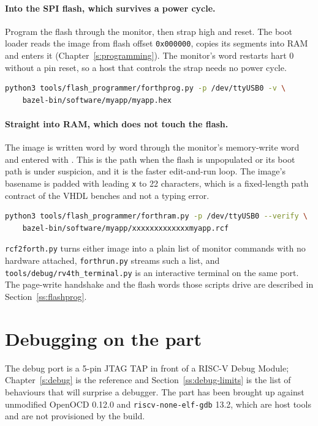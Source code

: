 \documentclass[11pt,pdftex,openany,letterpaper]{report}
\begin{document}
\paragraph{Into the SPI flash, which survives a power cycle.} Program the flash through the monitor, then strap  high and reset. The boot loader reads the image from flash offset \texttt{0x000000}, copies its segments into RAM and enters it (Chapter~\ref{s:programming}). The monitor's  word restarts hart 0 without a pin reset, so a host that controls the strap needs no power cycle.

\begin{lstlisting}[language=bash]
python3 tools/flash_programmer/forthprog.py -p /dev/ttyUSB0 -v \
    bazel-bin/software/myapp/myapp.hex
\end{lstlisting}

\paragraph{Straight into RAM, which does not touch the flash.} The image is written word by word through the monitor's memory-write word and entered with . This is the path when the flash is unpopulated or its boot path is under suspicion, and it is the faster edit-and-run loop. The image's basename is padded with leading \texttt{x} to 22 characters, which is a fixed-length path contract of the VHDL benches and not a typing error.

\begin{lstlisting}[language=bash]
python3 tools/flash_programmer/forthram.py -p /dev/ttyUSB0 --verify \
    bazel-bin/software/myapp/xxxxxxxxxxxxxmyapp.rcf
\end{lstlisting}

\noindent \texttt{rcf2forth.py} turns either image into a plain list of monitor commands with no hardware attached, \texttt{forthrun.py} streams such a list, and \texttt{tools/debug/rv4th\_terminal.py} is an interactive terminal on the same port. The page-write handshake and the flash words those scripts drive are described in Section~\ref{ss:flashprog}.

\section{Debugging on the part} \label{ss:swdebug}

The debug port is a 5-pin JTAG TAP in front of a RISC-V Debug Module; Chapter~\ref{s:debug} is the reference and Section~\ref{ss:debug-limits} is the list of behaviours that will surprise a debugger. The part has been brought up against unmodified OpenOCD 0.12.0 and \texttt{riscv-none-elf-gdb} 13.2, which are host tools and are not provisioned by the build.
\end{document}
